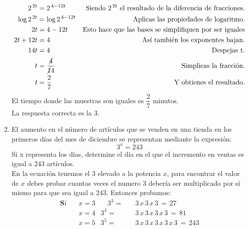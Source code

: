 \documentclass[11pt, a4paper]{article} %
\theoremstyle{dotlessP}
\theoremstyle{dotlessS}
\begin{document}
\begin{enumerate}[label=\color{dg}\theenumi.]
\begin{align*}
\\
2^{\,2t}  &= 2^{\,4 - 12t} &{\text{ Siendo} \,\, {2^{\,2t}}  \text{ el resultado de la diferencia de fracciones.}} 
\\
\log 2^{\,2t}  &= \log 2^{\,4 - 12t} &\text{Aplicas las propiedades de logaritmo.}  
\\
2t  &= 4 - 12t &\text{Esto hace que las bases se simplifiquen por ser iguales}  
\\
2t +  12t&= 4 &\text{Así también los exponentes bajan.}  
\\
14t&= 4  &\text{Despejas t.}  
\\
t &= \displaystyle\frac{\cancel 4}{\cancel 14} &\text{Simplicas la fracción.}  
\\
t &= \dfrac{2}{7} &\text{Y obtienes el resultado.}  
\end{align*}
El tiempo donde las muestras son iguales es $\dfrac{2}{7}$ minutos.
\\
{\color{dh} La respuesta correcta es la 3.}
\\
\item {\color{db} El aumento en el número de artículos que se venden en una tienda en los primeros días del mes de diciembre se representan mediante la expresión: 
\[
3^x = 243
\]
Si x representa los días, determine el día en el que el incremento en ventas es igual a 243 artículos.}
\\
En la ecuación tenemos el 3 elevado a la potencia \( x \), para encontrar el valor de \( x \) debes probar cuantas veces el numero 3 debería ser multiplicado por sí mismo para que sea igual a \( 243\).
Entonces probamos:
\begin{align*}
\textbf{Sí} \quad & x = 3 &\quad 3^3 = &\quad 3\, x\, 3\, x\, 3\, =\, 27 \\
            & x = 4 & 3^4 = &\quad 3\, x\, 3\, x\, 3\, x\, 3\, =\, 81\\
            & x = 5 & 3^5 = &\quad 3\, x\, 3\, x\, 3\, x\, 3\, x\, 3\, =\, 243 
\end{align*}


\end{enumerate}
\end{document}
